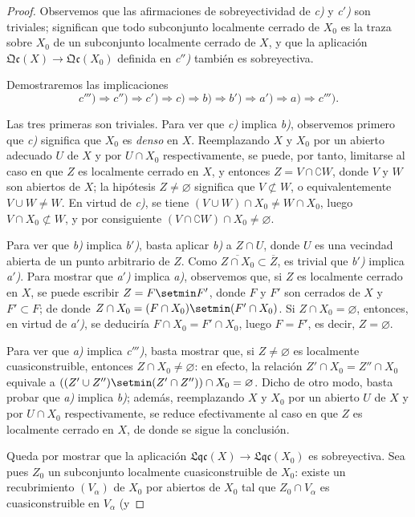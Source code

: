 \begin{proof}
Observemos que las afirmaciones de sobreyectividad de \emph{c)} y \emph{c$'$)} son triviales; significan que todo subconjunto localmente cerrado de $X_0$ es la traza sobre $X_0$ de un subconjunto localmente cerrado de $X$, y que la aplicación $\mathfrak{Qc}(X)\to\mathfrak{Qc}(X_0)$ definida en \emph{c$''$)} también es sobreyectiva.

Demostraremos las implicaciones
\[
c''')\Rightarrow c'')\Rightarrow c')\Rightarrow c)\Rightarrow b)
\Rightarrow b')\Rightarrow a')\Rightarrow a)\Rightarrow c''').
\]

Las tres primeras son triviales.
Para ver que \emph{c)} implica \emph{b)}, observemos primero que \emph{c)} significa que $X_0$ es \emph{denso} en $X$.
Reemplazando $X$ y $X_0$ por un abierto adecuado $U$ de $X$ y por $U\cap X_0$ respectivamente, se puede, por tanto, limitarse al caso en que $Z$ es localmente cerrado en $X$, y entonces $Z=V\cap\complement W$, donde $V$ y $W$ son abiertos de $X$; la hipótesis $Z\neq\varnothing$ significa que $V\not\subset W$, o equivalentemente $V\cup W\neq W$.
En virtud de \emph{c)}, se tiene $(V\cup W)\cap X_0\neq W\cap X_0$, luego $V\cap X_0\not\subset W$, y por consiguiente $(V\cap\complement W)\cap X_0\neq\varnothing$.

Para ver que \emph{b)} implica \emph{b$'$)}, basta aplicar \emph{b)} a $Z\cap U$, donde $U$ es una vecindad abierta de un punto arbitrario de $Z$.
Como $\overline{Z\cap X_0}\subset\overline{Z}$, es trivial que \emph{b$'$)} implica \emph{a$'$)}.
Para mostrar que \emph{a$'$)} implica \emph{a)}, observemos que, si $Z$ es localmente cerrado en $X$, se puede escribir $Z=F\setmin F'$, donde $F$ y $F'$ son cerrados de $X$ y $F'\subset F$; de donde $Z\cap X_0=(F\cap X_0)\setmin(F'\cap X_0)$.
Si $Z\cap X_0=\varnothing$, entonces, en virtud de \emph{a$'$)}, se deduciría $F\cap X_0=F'\cap X_0$, luego $F=F'$, es decir, $Z=\varnothing$.

Para ver que \emph{a)} implica \emph{c$'''$)}, basta mostrar que, si $Z\neq\varnothing$ es localmente cuasiconstruible, entonces $Z\cap X_0\neq\varnothing$: en efecto, la relación $Z'\cap X_0=Z''\cap X_0$ equivale a $((Z'\cup Z'')\setmin(Z'\cap Z''))\cap X_0=\varnothing$.
Dicho de otro modo, basta probar que \emph{a)} implica \emph{b)}; además, reemplazando $X$ y $X_0$ por un abierto $U$ de $X$ y por $U\cap X_0$ respectivamente, se reduce efectivamente al caso en que $Z$ es localmente cerrado en $X$, de donde se sigue la conclusión.

Queda por mostrar que la aplicación $\mathfrak{Lqc}(X)\to\mathfrak{Lqc}(X_0)$ es sobreyectiva.
Sea pues $Z_0$ un subconjunto localmente cuasiconstruible de $X_0$: existe un recubrimiento $(V_\alpha)$ de $X_0$ por abiertos de $X_0$ tal que $Z_0\cap V_\alpha$ es cuasiconstruible en $V_\alpha$ (y


\end{proof}
